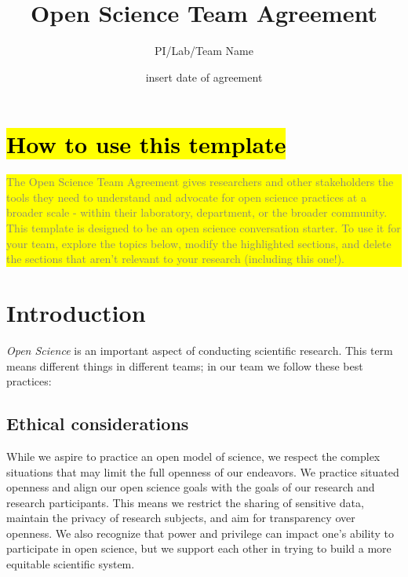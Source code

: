 \documentclass{article}
\title{Open Science Team Agreement}
\author{PI/Lab/Team Name}
\date{insert date of agreement}
\begin{document}

\maketitle

\section*{\textcolor{gray}{\hl{How to use this template}}}
\colorbox{yellow}{\parbox{\textwidth}{
\textcolor{gray}{The Open Science Team Agreement gives researchers and other stakeholders the tools they need to understand and advocate for open science practices at a broader scale - within their laboratory, department, or the broader community.
This template is designed to be an open science conversation starter. To use it for your team, explore the topics below, modify the highlighted sections, and delete the sections that aren’t relevant to your research (including this one!).
}}}

\section*{\textcolor{myGreen}{Introduction}} 

\textit{Open Science} is an important aspect of conducting scientific research. This term means different things in different teams; in our team we follow these best practices: 

\subsection*{Ethical considerations} While we aspire to practice an open model of science, we respect the complex situations that may limit the full openness of our endeavors. We practice situated openness and align our open science goals with the goals of our research and research participants. This means we restrict the sharing of sensitive data, maintain the privacy of research subjects, and aim for transparency over openness. We also recognize that power and privilege can impact one’s ability to participate in open science, but we support each other in trying to build a more equitable scientific system.
\end{document}
